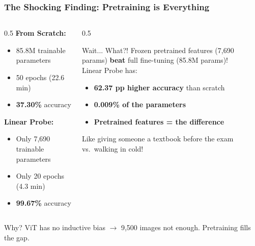 \documentclass[aspectratio=169]{beamer}
\begin{document}
\begin{frame}
    \frametitle{The Shocking Finding: Pretraining is Everything}
    \small
    \begin{columns}
        \begin{column}{0.5\textwidth}
            \textbf{From Scratch:}
            \begin{itemize}
                \item 85.8M trainable parameters
                \item 50 epochs (22.6 min)
                \item \textbf{37.30\%} accuracy
            \end{itemize}

            \vspace{0.2cm}

            \textbf{Linear Probe:}
            \begin{itemize}
                \item Only 7,690 trainable parameters
                \item Only 20 epochs (4.3 min)
                \item \textbf{99.67\%} accuracy
            \end{itemize}
        \end{column}

        \begin{column}{0.5\textwidth}
            \begin{alertblock}{Wait... What?!}
                Frozen pretrained features (7,690 params) \textbf{beat} full fine-tuning (85.8M params)!\\[0.3em]
                Linear Probe has:
                \begin{itemize}
                    \item \textbf{62.37 pp higher accuracy} than scratch
                    \item \textbf{0.009\% of the parameters}
                    \item \textbf{Pretrained features = the difference}
                \end{itemize}

                \vspace{0.15cm}

                Like giving someone a textbook before the exam vs.\ walking in cold!
            \end{alertblock}
        \end{column}
    \end{columns}

    \vspace{0.15cm}

    \begin{block}{Why?}
        ViT has no inductive bias $\rightarrow$ 9,500 images not enough. Pretraining fills the gap.
    \end{block}
\end{frame}
\end{document}
